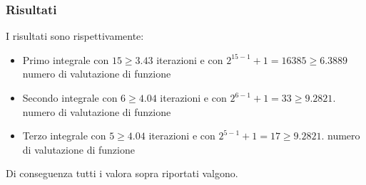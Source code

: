 \documentclass[11pt]{article}
\begin{document}
\subsubsection{Risultati}
I risultati sono rispettivamente:
\begin{itemize}
	\item Primo integrale con $15\geq 3.43$ iterazioni
e con $2^{15-1}+1=16385\geq 6.3889$ numero di valutazione di funzione 
	\item Secondo integrale con $6\geq 4.04$ iterazioni
e con $2^{6-1}+1=33\geq 9.2821.$ numero di valutazione di funzione 
	\item Terzo integrale con $5\geq 4.04$ iterazioni
e con $2^{5-1}+1=17\geq 9.2821.$ numero di valutazione di funzione 
\end{itemize}
Di conseguenza tutti i valora sopra riportati valgono.
\end{document}
